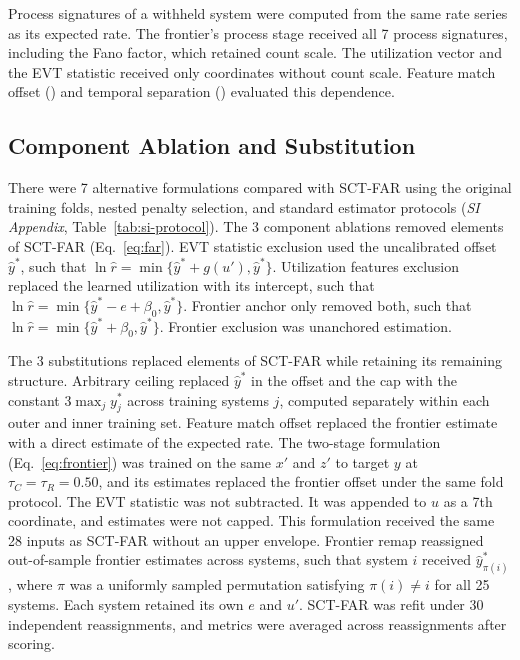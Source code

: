 \documentclass{article}
\begin{document}
Process signatures of a withheld system were computed from the same rate series as its expected rate. The frontier's process stage received all 7 process signatures, including the Fano factor, which retained count scale. The utilization vector and the EVT statistic received only coordinates without count scale. Feature match offset () and temporal separation () evaluated this dependence.

\subsection*{Component Ablation and Substitution}
\label{sec:ablation}
There were 7 alternative formulations compared with SCT-FAR using the original training folds, nested penalty selection, and standard estimator protocols (\textit{SI Appendix}, Table~\ref{tab:si-protocol}). The 3 component ablations removed elements of SCT-FAR (Eq.~\eqref{eq:far}). EVT statistic exclusion used the uncalibrated offset $\widehat{y}^*$, such that $\ln \widehat{r} = \min\{\widehat{y}^* + g(u'), \widehat{y}^*\}$. Utilization features exclusion replaced the learned utilization with its intercept, such that $\ln \widehat{r} = \min\{\widehat{y}^* - e + \beta_0, \widehat{y}^*\}$. Frontier anchor only removed both, such that $\ln \widehat{r} = \min\{\widehat{y}^* + \beta_0, \widehat{y}^*\}$. Frontier exclusion was unanchored estimation.

The 3 substitutions replaced elements of SCT-FAR while retaining its remaining structure. Arbitrary ceiling replaced $\widehat{y}^*$ in the offset and the cap with the constant $3\max_{j} y_j^{*}$ across training systems $j$, computed separately within each outer and inner training set. Feature match offset replaced the frontier estimate with a direct estimate of the expected rate. The two-stage formulation (Eq.~\eqref{eq:frontier}) was trained on the same $x'$ and $z'$ to target $y$ at $\tau_C = \tau_R = 0.50$, and its estimates replaced the frontier offset under the same fold protocol. The EVT statistic was not subtracted. It was appended to $u$ as a 7th coordinate, and estimates were not capped. This formulation received the same 28 inputs as SCT-FAR without an upper envelope. Frontier remap reassigned out-of-sample frontier estimates across systems, such that system $i$ received $\widehat{y}_{\pi(i)}^{*}$, where $\pi$ was a uniformly sampled permutation satisfying $\pi(i) \ne i$ for all 25 systems. Each system retained its own $e$ and $u'$. SCT-FAR was refit under 30 independent reassignments, and metrics were averaged across reassignments after scoring.
\end{document}
